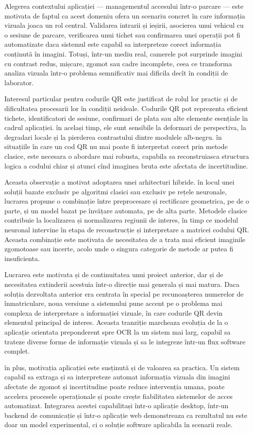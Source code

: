 Alegerea contextului aplicației --- managementul accesului într-o parcare --- este motivata de faptul ca acest domeniu ofera un scenariu concret în care informația vizuala joaca un rol central. Validarea intrarii și ieșirii, asocierea unui vehicul cu o sesiune de parcare, verificarea unui tichet sau confirmarea unei operații pot fi automatizate daca sistemul este capabil sa interpreteze corect informația conținută în imagini. Totuși, într-un mediu real, camerele pot surprinde imagini cu contrast redus, mișcare, zgomot sau cadre incomplete, ceea ce transforma analiza vizuala într-o problema semnificativ mai dificila decît în condiții de laborator.

Interesul particular pentru codurile QR este justificat de rolul lor practic și de dificultatea procesarii lor în condiții neideale. Codurile QR pot reprezenta eficient tichete, identificatori de sesiune, confirmari de plata sau alte elemente esențiale în cadrul aplicației. în același timp, ele sunt sensibile la deformari de perspectiva, la degradari locale și la pierderea contrastului dintre modulele alb-negru. în situațiile în care un cod QR nu mai poate fi interpretat corect prin metode clasice, este necesara o abordare mai robusta, capabila sa reconstruiasca structura logica a codului chiar și atunci cînd imaginea bruta este afectata de incertitudine.

Aceasta observație a motivat adoptarea unei arhitecturi hibride. în locul unei soluții bazate exclusiv pe algoritmi clasici sau exclusiv pe rețele neuronale, lucrarea propune o combinație între preprocesare și rectificare geometrica, pe de o parte, și un model bazat pe învățare automata, pe de alta parte. Metodele clasice contribuie la localizarea și normalizarea regiunii de interes, în timp ce modelul neuronal intervine în etapa de reconstrucție și interpretare a matricei codului QR. Aceasta combinație este motivata de necesitatea de a trata mai eficient imaginile zgomotoase sau incerte, acolo unde o singura categorie de metode ar putea fi insuficienta.

Lucrarea este motivata și de continuitatea unui proiect anterior, dar și de necesitatea extinderii acestuia într-o direcție mai generala și mai matura. Daca soluția dezvoltata anterior era centrata în special pe recunoașterea numerelor de înmatriculare, noua versiune a sistemului pune accent pe o problema mai complexa de interpretare a informației vizuale, în care codurile QR devin elementul principal de interes. Aceasta tranziție marcheaza evoluția de la o aplicație orientata preponderent spre OCR la un sistem mai larg, capabil sa trateze diverse forme de informație vizuala și sa le integreze într-un flux software complet.

în plus, motivația aplicației este susținută și de valoarea sa practica. Un sistem capabil sa extraga și sa interpreteze automat informația vizuala din imagini afectate de zgomot și incertitudine poate reduce intervenția umana, poate accelera procesele operaționale și poate crește fiabilitatea sistemelor de acces automatizat. Integrarea acestei capabilitași într-o aplicație desktop, într-un backend de comunicație și într-o aplicație web demonstreaza ca rezultatul nu este doar un model experimental, ci o soluție software aplicabila în scenarii reale.
